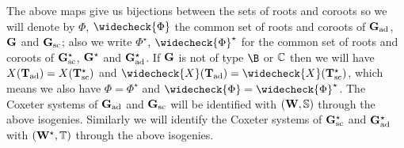 \documentclass[eqthmnum]{jt-calcs}
\begin{document}
\begin{pa}
The above maps give us bijections between the sets of roots and coroots so we will denote by $\Phi$, $\widecheck{\Phi}$ the common set of roots and coroots of $\mathbf{G}_{\operatorname{ad}}$, $\mathbf{G}$ and $\mathbf{G}_{\operatorname{sc}}$; also we write $\Phi^{\star}$, $\widecheck{\Phi}^{\star} $ for the common set of roots and coroots of $\mathbf{G}_{\operatorname{sc}}^{\star}$, $\mathbf{G}^{\star}$ and $\mathbf{G}_{\operatorname{ad}}^{\star}$. If $\mathbf{G}$ is not of type $\B$ or ${\mathbb C}$ then we will have $X(\mathbf{T}_{\operatorname{ad}}) = X(\mathbf{T}_{\operatorname{sc}}^{\star})$ and $\widecheck{X}(\bT_{\ad}) = \widecheck{X}(\bT_{\simc}^{\star})$, which means we also have $\Phi = \Phi^{\star}$ and $\widecheck{\Phi} = \widecheck{\Phi}^{\star}$. The Coxeter systems of $\mathbf{G}_{\operatorname{ad}}$ and $\mathbf{G}_{\operatorname{sc}}$ will be identified with $(\mathbf{W},\mathbb{S})$ through the above isogenies. Similarly we will identify the Coxeter systems of $\mathbf{G}_{\operatorname{sc}}^{\star}$ and $\mathbf{G}_{\operatorname{ad}}^{\star}$ with $(\mathbf{W}^{\star},\mathbb{T})$ through the above isogenies.
\end{pa}
\end{document}
